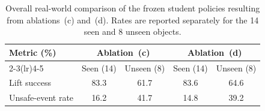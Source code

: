 \begin{table}[H]
\centering
\footnotesize
\caption{Overall real-world comparison of the frozen student policies
resulting from ablations~(c) and~(d). Rates are reported separately for the 14 seen and 8 unseen objects.}
\label{tab:physical_baseline_comparison}
\setlength{\tabcolsep}{6pt}
\renewcommand{\arraystretch}{1.15}
\begin{tabular}{lcccc}
\toprule
\multirow{2}{*}{Metric (\%)}
& \multicolumn{2}{c}{Ablation~(c)}
& \multicolumn{2}{c}{Ablation~(d)} \\
\cmidrule(lr){2-3}\cmidrule(lr){4-5}
& Seen (14) & Unseen (8)
& Seen (14) & Unseen (8) \\
\midrule
Lift success
& 83.3 & 61.7
& 83.6 & 64.6 \\
Unsafe-event rate
& 16.2 & 41.7
& 14.8 & 39.2 \\
\bottomrule
\end{tabular}
\end{table}
